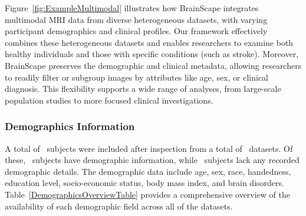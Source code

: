 Figure~\ref{fig:ExampleMultimodal} illustrates how BrainScape integrates multimodal MRI data 
from diverse heterogeneous datasets, with varying participant demographics and clinical profiles. 
Our framework effectively combines these heterogeneous datasets and enables researchers 
to examine both healthy individuals and those with specific conditions (such as stroke). 
Moreover, BrainScape preserves the demographic and clinical metadata, allowing researchers 
to readily filter or subgroup images by attributes like age, sex, or clinical diagnosis. 
This flexibility supports a wide range of analyses, from large-scale population studies 
to more focused clinical investigations.


\subsubsection{Demographics Information}

A total of \TotalSubjectsIncludedAfterInspectionCount\ subjects were included after inspection 
from a total of \NumDatasets\ datasets. Of these, \TotalSubjectsWithDemographicsInfoCount\ subjects 
have demographic information, while \TotalSubjectsWithoutDemographicsInfoCount\ 
subjects lack any recorded demographic details. The demographic data include age, sex, race, handedness, education level, 
socio-economic status, body mass index, and brain disorders. Table~\ref{DemographicsOverviewTable} provides a comprehensive 
overview of the availability of each demographic field across all of the datasets.

